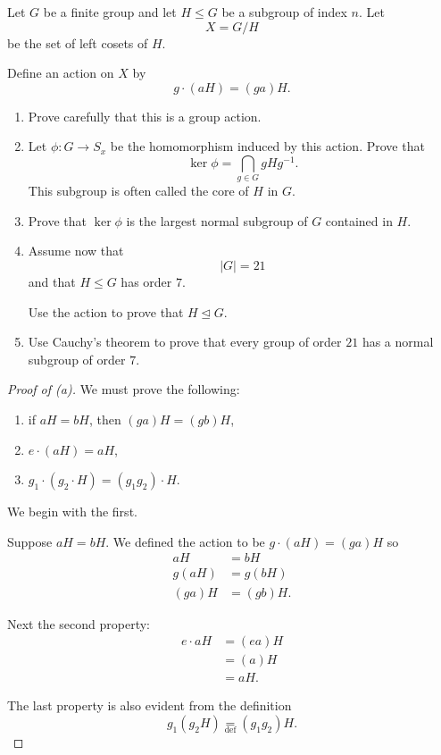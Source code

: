 \begin{prob}
    Let $G$ be a finite group and let 
    $H \leq G$ be a subgroup of index 
    $n$. Let 
    \[
        X = G / H 
    \]
    be the set of left cosets of $H$.

    Define an action on $X$ by 
    \[
        g \cdot (aH) = (ga) H. 
    \]

    \begin{enumerate}[label=\alph*)]
        \item Prove carefully that this is a 
            group action. 
        \item Let $\phi : G \to S_x$ 
            be the homomorphism induced by 
            this action. 
            Prove that 
            \[
                \ker \phi = 
                \bigcap_{g\in G} gHg^{-1}.
            \]
            This subgroup is often called the 
            core of $H$ in $G$.
        \item Prove that $\ker \phi$ is the 
            largest normal subgroup of $G$ 
            contained in $H$.
        \item Assume now that 
            \[
                |G| = 21
            \]
            and that $H \leq G$ has 
            order $7$. 

            Use the action to prove that 
            $H \trianglelefteq G$. 
        \item Use Cauchy's theorem to prove that 
            every group of order $21$ has 
            a normal subgroup of order $7$.
    \end{enumerate}
\end{prob}
\begin{proof}[Proof of (a)]
    We must prove the following: 
    \begin{enumerate}
        \item if $aH = bH$, then 
            $(ga)H = (gb)H$,
        \item $e \cdot (aH) = aH$, 
        \item $g_1 \cdot (g_2 \cdot H) = (g_1g_2) \cdot H$.
    \end{enumerate}
    We begin with the first.

    Suppose $aH = bH$. We defined the 
    action to be $g \cdot (aH) = (ga)H$ so 
    \begin{align*}
        aH &= bH \\ 
        g(aH) &= g(bH) \\ 
        (ga)H &= (gb)H.
    \end{align*}
    
    Next the second property: 
    \begin{align*}
        e \cdot aH 
        &= (ea)H \\ 
        &= (a)H \\ 
        &= aH.
    \end{align*}

    The last property is also evident from 
    the definition 
    \[
        g_1 (g_2 H) \underset{\text{def}}{=} (g_1g_2)H.
    \]
    
\end{proof}

